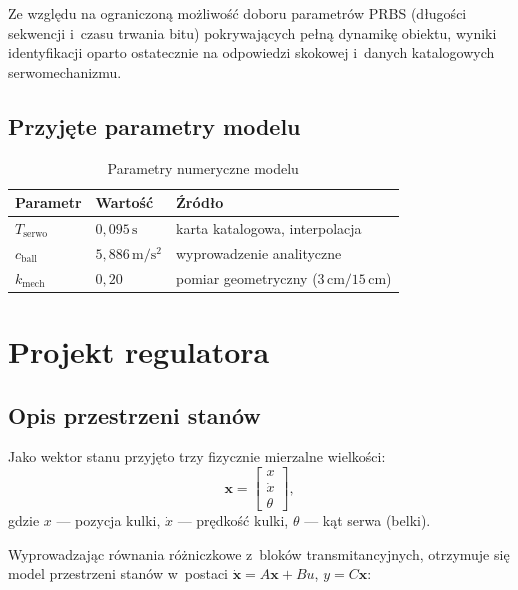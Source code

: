 Ze względu na ograniczoną możliwość doboru parametrów PRBS
(długości sekwencji i~czasu trwania bitu) pokrywających pełną dynamikę
obiektu, wyniki identyfikacji oparto ostatecznie na odpowiedzi skokowej
i~danych katalogowych serwomechanizmu.

\subsection{Przyjęte parametry modelu}

\begin{table}[H]
  \centering
  \caption{Parametry numeryczne modelu}
  \label{tab:parametry}
  \begin{tabular}{lll}
    \toprule
    \textbf{Parametr} & \textbf{Wartość} & \textbf{Źródło} \\
    \midrule
    $T_{\mathrm{serwo}}$ & $0{,}095\,\mathrm{s}$ & karta katalogowa, interpolacja \\
    $c_{\mathrm{ball}}$  & $5{,}886\,\mathrm{m/s^2}$ & wyprowadzenie analityczne \\
    $k_{\mathrm{mech}}$  & $0{,}20$ & pomiar geometryczny ($3\,\mathrm{cm}/15\,\mathrm{cm}$) \\
    \bottomrule
  \end{tabular}
\end{table}

\section{Projekt regulatora}

\subsection{Opis przestrzeni stanów}

Jako wektor stanu przyjęto trzy fizycznie mierzalne wielkości:
\begin{equation}
  \mathbf{x} = \begin{bmatrix} x \\ \dot{x} \\ \theta \end{bmatrix},
\end{equation}
gdzie $x$ — pozycja kulki, $\dot{x}$ — prędkość kulki, $\theta$ — kąt serwa (belki).

Wyprowadzając równania różniczkowe z~bloków transmitancyjnych, otrzymuje się model
przestrzeni stanów w~postaci $\dot{\mathbf{x}} = A\mathbf{x} + Bu$, $y = C\mathbf{x}$:

